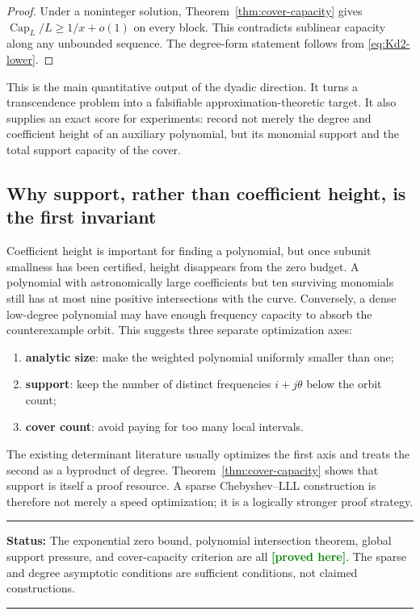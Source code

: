 \documentclass[11pt,oneside]{article}
\theoremstyle{definition}
\theoremstyle{remark}
\newcommand{\tht}{\theta}
\newcommand{\statusproved}{\textcolor{green}{\textbf{[proved here]}}}
\newenvironment{statusbox}[1]
{\begin{center}\begin{minipage}{0.95\textwidth}\raggedright\hrule
\vspace{0.45em}\textbf{Status:} #1\par\vspace{0.35em}}
{\vspace{0.35em}\hrule\end{minipage}\end{center}}
\begin{document}
\begin{proof}
Under a noninteger solution, Theorem~\ref{thm:cover-capacity} gives
$\operatorname{Cap}_L/L\ge 1/x+o(1)$ on every block.  This contradicts sublinear capacity along
any unbounded sequence.  The degree-form statement follows from \eqref{eq:Kd2-lower}.
\end{proof}

This is the main quantitative output of the dyadic direction.  It turns a transcendence problem into
a falsifiable approximation-theoretic target.  It also supplies an exact score for experiments:
record not merely the degree and coefficient height of an auxiliary polynomial, but its monomial
support and the total support capacity of the cover.

\subsection{Why support, rather than coefficient height, is the first invariant}

Coefficient height is important for finding a polynomial, but once subunit smallness has been
certified, height disappears from the zero budget.  A polynomial with astronomically large
coefficients but ten surviving monomials still has at most nine positive intersections with the
curve.  Conversely, a dense low-degree polynomial may have enough frequency capacity to absorb the
counterexample orbit.  This suggests three separate optimization axes:

\begin{enumerate}
\item \textbf{analytic size}: make the weighted polynomial uniformly smaller than one;
\item \textbf{support}: keep the number of distinct frequencies $i+j\tht$ below the orbit count;
\item \textbf{cover count}: avoid paying for too many local intervals.
\end{enumerate}

The existing determinant literature usually optimizes the first axis and treats the second as a
byproduct of degree.  Theorem~\ref{thm:cover-capacity} shows that support is itself a proof resource.
A sparse Chebyshev--LLL construction is therefore not merely a speed optimization; it is a logically
stronger proof strategy.

\begin{statusbox}{The exponential zero bound, polynomial intersection theorem, global support
pressure, and cover-capacity criterion are all \statusproved.  The sparse and degree asymptotic
conditions are sufficient conditions, not claimed constructions.}
\end{statusbox}
\end{document}
